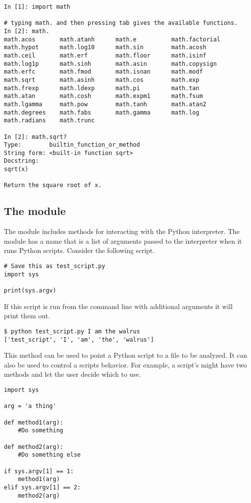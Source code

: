 \begin{lstlisting}
In [1]: import math

# typing math. and then pressing tab gives the available functions.
In [2]: math.
math.acos       math.atanh      math.e          math.factorial  
math.hypot      math.log10      math.sin        math.acosh      
math.ceil       math.erf        math.floor      math.isinf      
math.log1p      math.sinh       math.asin       math.copysign   
math.erfc       math.fmod       math.isnan      math.modf       
math.sqrt       math.asinh      math.cos        math.exp        
math.frexp      math.ldexp      math.pi         math.tan        
math.atan       math.cosh       math.expm1      math.fsum       
math.lgamma     math.pow        math.tanh       math.atan2      
math.degrees    math.fabs       math.gamma      math.log        
math.radians    math.trunc

In [2]: math.sqrt?
Type:        builtin_function_or_method
String form: <built-in function sqrt>
Docstring:
sqrt(x)

Return the square root of x.
\end{lstlisting}

\subsection*{The  module}

The  module includes methods for interacting with the Python interpreter.
The module has a name  that is a list of arguments passed to the interpreter when it runs Python scripts.
Consider the following script.

\begin{lstlisting}
# Save this as test_script.py
import sys

print(sys.argv)
\end{lstlisting}

If this script is run from the command line with additional arguments it will print them out.

\begin{lstlisting}
$ python test_script.py I am the walrus
['test_script', 'I', 'am', 'the', 'walrus']
\end{lstlisting}

This method can be used to point a Python script to a file to be analyzed.
It can also be used to control a scripts behavior.
For example, a script's might have two methods and let the user decide which to use.
\begin{lstlisting}
import sys

arg = 'a thing'

def method1(arg):
	#Do something

def method2(arg):
	#Do something else

if sys.argv[1] == 1:
	method1(arg)
elif sys.argv[1] == 2:
	method2(arg)
\end{lstlisting}

